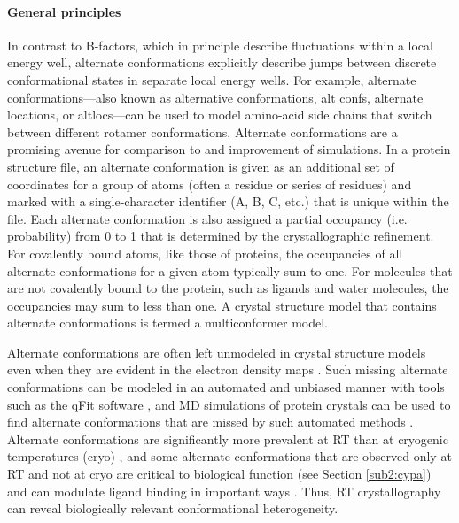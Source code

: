 \documentclass[9pt,review]{livecoms}
\begin{document}
\paragraph{General principles}

In contrast to B-factors, which in principle describe fluctuations within a local energy well, alternate conformations explicitly describe jumps between discrete conformational states in separate local energy wells.
For example, alternate conformations---also known as alternative conformations, alt confs, alternate locations, or altlocs---can be used to model amino-acid side chains that switch between different rotamer \cite{dunbrack_backbone-dependent_1993,lovell_penultimate_2000} conformations.
Alternate conformations are a promising avenue for comparison to and improvement of simulations.
In a protein structure file, an alternate conformation is given as an additional set of coordinates for a group of atoms (often a residue or series of residues) and marked with a single-character identifier (A, B, C, etc.) that is unique within the file.
Each alternate conformation is also assigned a partial occupancy (i.e. probability) from 0 to 1 that is determined by the crystallographic refinement.
For covalently bound atoms, like those of proteins, the occupancies of all alternate conformations for a given atom typically sum to one.
For molecules that are not covalently bound to the protein, such as ligands and water molecules, the occupancies may sum to less than one.
A crystal structure model that contains alternate conformations is termed a multiconformer model.

Alternate conformations are often left unmodeled in crystal structure models even when they are evident in the electron density maps \cite{lang_automated_2010}.
Such missing alternate conformations can be modeled in an automated and unbiased manner with tools such as the qFit software \cite{riley_qfit_2021}, and MD simulations of protein crystals can be used to find alternate conformations that are missed by such automated methods \cite{wych_molecular-dynamics_2023}.
Alternate conformations are significantly more prevalent at RT than at cryogenic temperatures (cryo) \cite{fraser_accessing_2011}, and some alternate conformations that are observed only at RT and not at cryo are critical to biological function \cite{fraser_hidden_2009} (see Section \ref{sub2:cypa}) and can modulate ligand binding in important ways \cite{cbradford_temperature_2021}.
Thus, RT crystallography can reveal biologically relevant conformational heterogeneity.
\end{document}
